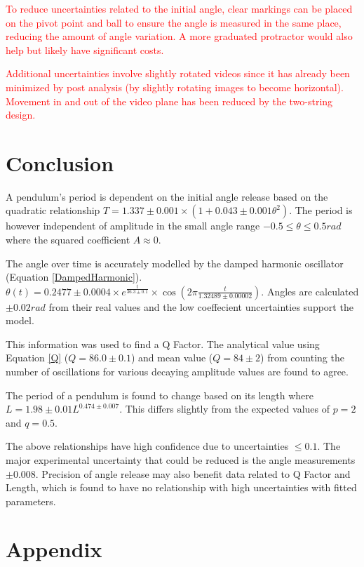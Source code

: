 \documentclass[12pt,twocolumn]{article}
\begin{document}
\textcolor{red}{To reduce uncertainties related to the initial angle, clear markings can be placed on
the pivot point and ball to ensure the angle
is measured in the same place, reducing the
amount of angle variation. A more graduated
protractor would also help but likely have significant costs.}

\textcolor{red}{Additional uncertainties involve slightly rotated videos since it has already been 
minimized by post analysis (by slightly rotating
images to become horizontal). Movement in
and out of the video plane has been reduced
by the two-string design.}

\section{Conclusion}
A pendulum's period is dependent on the initial angle release based on the quadratic relationship 
$T = 1.337 \pm 0.001 \times (1 + 0.043 \pm 0.001\theta^2)$. The period is however independent of amplitude in the
small angle range $-0.5 \leq \theta \leq 0.5 rad$ where the squared coefficient $A \approx 0$.

The angle over time is accurately modelled by the damped harmonic oscillator (Equation \ref{DampedHarmonic}).
$\theta(t) = 0.2477 \pm 0.0004 \times e^{\frac{t}{36.3 \pm 0.1}} \times \cos(2\pi \frac{t}{1.32489 \pm 0.00002})$.
Angles are calculated $\pm 0.02 rad$ from their real values and the low coeffecient uncertainties support the model.

This information was used to find a Q Factor. The analytical value using Equation \ref{Q} ($Q = 86.0 \pm 0.1$) and 
mean value ($Q = 84 \pm 2$) from counting the number of oscillations for various decaying amplitude values are found to agree.

The period of a pendulum is found to change based on its length where $L = 1.98 \pm 0.01 L^{0.474 \pm 0.007}$. This
differs slightly from the expected values of $p = 2$ and $q = 0.5$.

The above relationships have high confidence due to uncertainties $\leq 0.1$. The major experimental uncertainty that could be reduced is the angle measurements $\pm 0.008$.
Precision of angle release may also benefit data related to Q Factor and Length, which is found to have no relationship with high uncertainties with fitted parameters.

\appendix
\section*{Appendix}
\end{document}
